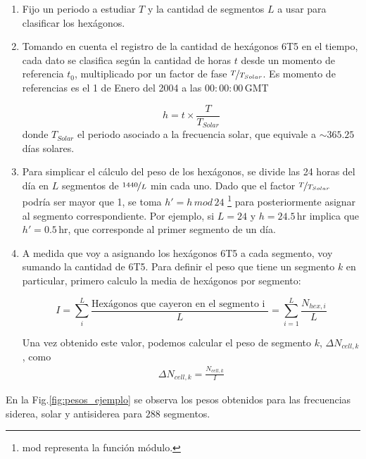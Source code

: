       \begin{enumerate}
        \item Fijo un periodo a estudiar $T$ y la cantidad de segmentos $L$ a usar para clasificar los hexágonos.

        \item Tomando en cuenta el registro de la cantidad de hexágonos 6T5 en el tiempo, cada dato se clasifica según la cantidad de horas $t$ desde un momento de referencia $t_0$, multiplicado por un factor de fase $\nicefrac{T}{T_{Solar}}$. Es momento de referencias es el 1 de Enero del 2004 a las $00:00:00\,$GMT

         \begin{equation*}
          h = t \times \frac{T}{T_{Solar}}
        \end{equation*}
        donde $T_{Solar}$ el periodo asociado a la frecuencia solar, que equivale a $\sim 365.25$  días solares. 
        
        \item Para simplicar el cálculo del peso de los hexágonos, se divide las 24 horas del día en $L$ segmentos de $\nicefrac{1440}{L}$ min cada uno. Dado que el factor $\nicefrac{T}{T_{Solar}}$ podría ser mayor que 1, se toma $h' = h\, mod \,24$ \footnote{mod representa la función módulo.} para posteriormente asignar al segmento correspondiente. Por ejemplo, si $L=24$ y  $h=24.5\,$hr implica que $h'= 0.5\,$hr, que corresponde al primer  segmento de un día.
       
       \item A medida que voy a asignando los hexágonos 6T5 a cada segmento, voy sumando la cantidad de 6T5. Para definir el peso que tiene un segmento $k$ en particular, primero calculo la media de hexágonos por segmento:
       
       \begin{equation}
         I = \sum^{L}_i \frac{\text{Hexágonos que cayeron en el segmento  i }}{L} = \sum^{L}_{i=1} \frac{N_{hex, i}}{L}
       \end{equation}
       
       Una vez obtenido este valor, podemos calcular el peso de segmento $k$,  $\Delta N_{cell,k}$,  como
        \begin{align}
         \Delta N_{cell,k} = \frac{N_{cell, k}}{I}
         \end{align} 
      \end{enumerate}

      En la Fig.\ref{fig:pesos_ejemplo} se observa los pesos obtenidos para las frecuencias siderea, solar y antisiderea para $288$ segmentos.


